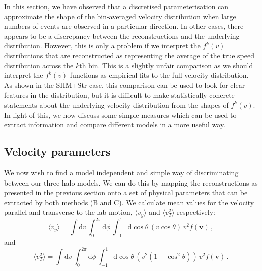 In this section, we have observed that a discretised parameterisation can approximate the shape of the bin-averaged velocity distribution when large numbers of events are observed in a particular direction. In other cases, there appears to be a discrepancy between the reconstructions and the underlying distribution. However, this is only a problem if we interpret the $f^k(v)$ distributions that are reconstructed as representing the average of the true speed distribution across the $k$th bin. This is a slightly unfair comparison as we should interpret the $f^k(v)$ functions as empirical fits to the full velocity distribution. As shown in the SHM+Str case, this comparison can be used to look for clear features in the distribution, but it is difficult to make statistically concrete statements about the underlying velocity distribution from the shapes of $f^k(v)$. In light of this, we now discuss some simple measures which can be used to extract information and compare different models in a more useful way.

\subsection{Velocity parameters}\label{sec:directional_parameters}
We now wish to find a model independent and simple way of discriminating between our three halo models. We can do this by mapping the reconstructions as presented in the previous section onto a set of physical parameters that can be extracted by both methods (B and C). We calculate mean values for the velocity parallel and transverse to the lab motion, $\langle v_y\rangle$ and $\langle v_T^2 \rangle$ respectively:
\begin{equation}\label{eq:vy}
\langle v_y \rangle = \int \mathrm{d}v \,\int_{0}^{2\pi} \mathrm{d}\phi \, \int_{-1}^1 \mathrm{d}\cos\theta \, (v\cos\theta)\, v^2 f(\mathbf{v}) \, ,
\end{equation}
and
\begin{equation}\label{eq:vT}
\langle v_T^2 \rangle = \int \mathrm{d}v \,\int_{0}^{2\pi} \mathrm{d}\phi \, \int_{-1}^1 \mathrm{d}\cos\theta \, (v^2(1-\cos^2\theta))\, v^2 f(\mathbf{v}) \, .
\end{equation}

